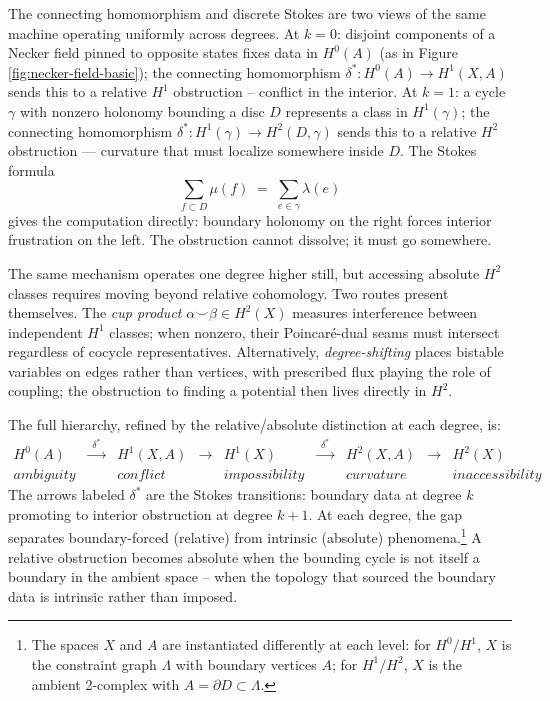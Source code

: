 \documentclass[11pt]{amsart}  %
\theoremstyle{plain}
\theoremstyle{definition}
\theoremstyle{remark}
\newcommand{\style}[1]{{\em #1}} %
\newcommand{\connecting}{\delta^*} %
\newcommand{\cgraph}{\Lambda} %
\newcommand{\coupling}{\lambda} %
\begin{document}
The connecting homomorphism and discrete Stokes are two views of the same machine
operating uniformly across degrees. At $k = 0$: disjoint  
components of a Necker field pinned to opposite states fixes  
data in $H^0(A)$ (as in Figure \ref{fig:necker-field-basic}); 
the connecting homomorphism $\connecting: H^0(A) \to H^1(X, A)$ 
sends this to a relative $H^1$ obstruction -- conflict in the interior. 
At $k = 1$: a cycle $\gamma$ with nonzero holonomy bounding a disc $D$ 
represents a class in $H^1(\gamma)$; the connecting homomorphism 
$\connecting: H^1(\gamma) \to H^2(D, \gamma)$ sends this to a 
relative $H^2$ obstruction --- curvature that must localize somewhere 
inside $D$. The Stokes formula
\[
\sum_{f \subset D} \mu(f) \;=\; \sum_{e \in \gamma} \coupling(e)
\]
gives the computation directly: boundary holonomy on the right forces 
interior frustration on the left. The obstruction cannot dissolve; it 
must go somewhere.

The same mechanism operates one degree higher still, but accessing 
absolute $H^2$ classes requires moving beyond relative cohomology. Two 
routes present themselves. The \style{cup product} 
$\alpha \smile \beta \in H^2(X)$ measures interference between 
independent $H^1$ classes; when nonzero, their Poincar\'e-dual seams 
must intersect regardless of cocycle representatives. Alternatively, 
\style{degree-shifting} places bistable variables on edges rather than 
vertices, with prescribed flux playing the role of coupling; the 
obstruction to finding a potential then lives directly in $H^2$.

The full hierarchy, refined by the relative/absolute distinction at each degree, is:
\[
\begin{array}{ccccccccc}
H^0(A) & \xrightarrow{\;\;\connecting\;\;} & H^1(X,A) & \longrightarrow & H^1(X) & \xrightarrow{\;\;\connecting\;\;} & H^2(X,A) & \longrightarrow & H^2(X) \\[1.5ex]
\textit{ambiguity} && \textit{conflict} && \textit{impossibility} && \textit{curvature} && \textit{inaccessibility}
\end{array}
\]
The arrows labeled $\connecting$ are the Stokes transitions: boundary data at degree $k$ promoting to interior obstruction at degree $k+1$. At each degree, the gap separates boundary-forced (relative) from intrinsic (absolute) phenomena.\footnote{The spaces $X$ and $A$ are instantiated differently at each level: for $H^0/H^1$, $X$ is the constraint graph $\cgraph$ with boundary vertices $A$; for $H^1/H^2$, $X$ is the ambient 2-complex with $A = \partial D \subset \cgraph$.} A relative obstruction becomes absolute when the bounding cycle is not itself a boundary in the ambient space -- when the topology that sourced the boundary data is intrinsic rather than imposed.
\end{document}
